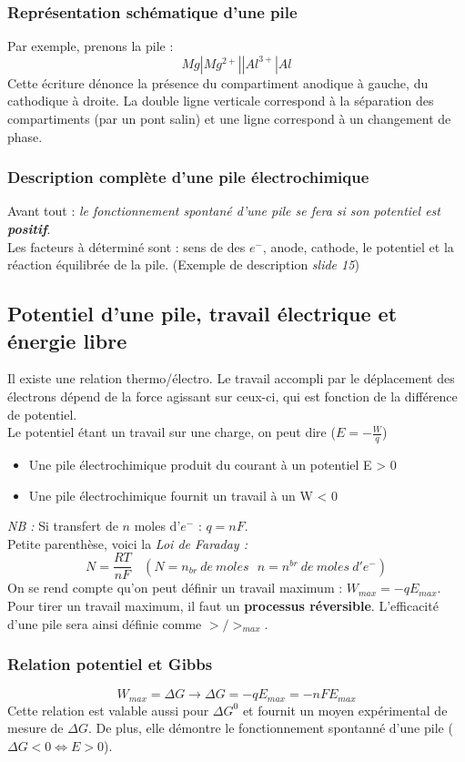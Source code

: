 \documentclass[12pt, a4paper]{article}
\begin{document}
\subsubsection{Représentation schématique d'une pile}
Par exemple, prenons la pile :
$$Mg | Mg^{2+} || Al^{3+} | Al$$
Cette écriture dénonce la présence du compartiment anodique à gauche, du cathodique à droite. La double ligne verticale correspond à la séparation des compartiments (par un pont salin) et une ligne correspond à un changement de phase.

\subsubsection{Description complète d'une pile électrochimique}
Avant tout : \textit{le fonctionnement spontané d'une pile se fera si son potentiel est \textbf{positif}}.\\
Les facteurs à déterminé sont : sens de des $e^-$, anode, cathode, le potentiel et la réaction équilibrée de la pile. (Exemple de description \textit{slide 15})

\subsection{Potentiel d'une pile, travail électrique et énergie libre}
Il existe une relation thermo/électro. Le travail accompli par le déplacement des électrons dépend de la force agissant sur ceux-ci, qui est fonction de la différence de potentiel.\\
Le potentiel étant un travail sur une charge, on peut dire ($E = -\frac{W}{q}$)
\begin{itemize}
\item Une pile électrochimique produit du courant à un potentiel E > 0
\item Une pile électrochimique fournit un travail à un W < 0
\end{itemize}
\textit{NB :} Si transfert de $n$ moles d'$e^-$ : $q = nF$.\\

Petite parenthèse, voici la \textit{Loi de Faraday :}
$$N = \frac{RT}{nF}\ \ \ \ (N = n_{br}\ de\ moles\ \ \ n = n^{br}\ de\ moles\ d'e^-)$$
On se rend compte qu'on peut définir un travail maximum : $W_{max} = -qE_{max}$. Pour tirer un travail maximum, il faut un \textbf{processus réversible}. L'efficacité d'une pile sera ainsi définie comme $>/>_{max}$.
\subsubsection*{Relation potentiel et Gibbs}
$$W_{max} = \Delta G \rightarrow \Delta G = -qE_{max} = -nFE_{max}$$
Cette relation est valable aussi pour $\Delta G^0$ et fournit un moyen expérimental de mesure de $\Delta G$. De plus, elle démontre le fonctionnement spontanné d'une pile ($\Delta G <0 \Leftrightarrow E > 0$).
\end{document}
